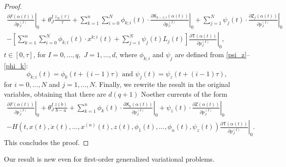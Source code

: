 \documentclass{my-aims}
\theoremstyle{definition}
\begin{document}
\begin{proof}
\begin{equation*}
\begin{split}
\left.\frac{\partial F(\alpha(t))}{\partial p_J^{(I)}}\right|_0
+\theta_J^I\frac{z_N(\tau)}{\tau}
+\sum_{k=1}^{n}\sum_{i=0}^{N}\phi_{k;i}(t)
\cdot \left. \frac{\partial \mathsf{X}_{k-1;i}(\alpha(t))}{\partial p_J^{(I)}}\right|_0
+\sum_{j=1}^{N}\psi_j(t)\cdot \left. \frac{\partial \mathsf{Z}_j(\alpha(t))}{\partial p_J^{(I)}}\right|_0\\
- \left[ \sum_{k=1}^{n}\sum_{i=0}^{N}\phi_{k;i}(t)\cdot x^{k;i}(t)
+\sum_{j=1}^{N} \psi_j(t) L_j(t)\right]
\left. \frac{\partial \mathsf{T}(\alpha(t))}{\partial p_J^{(I)}}\right|_0,
\end{split}
\end{equation*}
$t \in [0,\tau]$, for $I=0,\dots,q,$ $J=1,\dots,d$, where 
$\phi_{k;i}$ and $\psi_j$ are defined from \eqref{psi_z}--\eqref{phi_k}:
\begin{equation*}
\phi_{k;i}(t)=\phi_k(t+(i-1)\tau) \text{ and } \psi_j(t)=\psi_z(t+(i-1)\tau),
\end{equation*}
for $i=0,\dots,N$ and $j=1,\dots, N$. Finally, we rewrite the result 
in the original variables, obtaining that there are $d(q+1)$ Noether currents of the form
\begin{multline*}
\left.\frac{\partial F(\alpha(t))}{\partial p_J^{(I)}}\right|_0+\theta_J^I\frac{z(b)}{b-a}
+\sum_{k=1}^{n}\phi_k(t)\cdot \left. \frac{\partial \mathsf{X}_k(\alpha(t))}{\partial p_J^{(I)}}\right|_0
+\psi_z(t)\cdot \left. \frac{\partial \mathsf{Z}(\alpha(t))}{\partial p_J^{(I)}}\right|_0\\
-\left.	H(t,x(t),\dot{x}(t),\dots, x^{(n)}(t),z(t),\phi_1(t),
\dots,\phi_n(t),\psi_z(t))\frac{\partial \mathsf{T}(\alpha(t))}{\partial p_J^{(I)}}\right|_0.
\end{multline*}
This concludes the proof.
\end{proof}

Our result is new even for first-order generalized variational problems.
\end{document}
